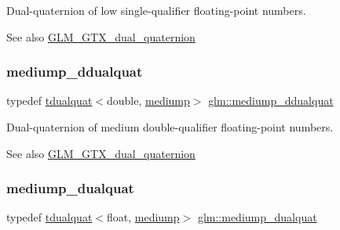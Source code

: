 Dual-\/quaternion of low single-\/qualifier floating-\/point numbers.

\begin{DoxySeeAlso}{See also}
\hyperlink{group__gtx__dual__quaternion}{G\+L\+M\+\_\+\+G\+T\+X\+\_\+dual\+\_\+quaternion} 
\end{DoxySeeAlso}
\mbox{\label{group__gtx__dual__quaternion_ga5727116ab20b2a1d40387766d723dd6c}} 
\subsubsection{\texorpdfstring{mediump\+\_\+ddualquat}{mediump\_ddualquat}}
{\footnotesize\ttfamily typedef \hyperlink{structglm_1_1tdualquat}{tdualquat}$<$double, \hyperlink{namespaceglm_a36ed105b07c7746804d7fdc7cc90ff25a6416f3ea0c9025fb21ed50c4d6620482}{mediump}$>$ \hyperlink{group__gtx__dual__quaternion_ga5727116ab20b2a1d40387766d723dd6c}{glm\+::mediump\+\_\+ddualquat}}

Dual-\/quaternion of medium double-\/qualifier floating-\/point numbers.

\begin{DoxySeeAlso}{See also}
\hyperlink{group__gtx__dual__quaternion}{G\+L\+M\+\_\+\+G\+T\+X\+\_\+dual\+\_\+quaternion} 
\end{DoxySeeAlso}
\mbox{\label{group__gtx__dual__quaternion_gaa88fe93eb823d1aba8d6df8028572cb5}} 
\subsubsection{\texorpdfstring{mediump\+\_\+dualquat}{mediump\_dualquat}}
{\footnotesize\ttfamily typedef \hyperlink{structglm_1_1tdualquat}{tdualquat}$<$float, \hyperlink{namespaceglm_a36ed105b07c7746804d7fdc7cc90ff25a6416f3ea0c9025fb21ed50c4d6620482}{mediump}$>$ \hyperlink{group__gtx__dual__quaternion_gaa88fe93eb823d1aba8d6df8028572cb5}{glm\+::mediump\+\_\+dualquat}}

